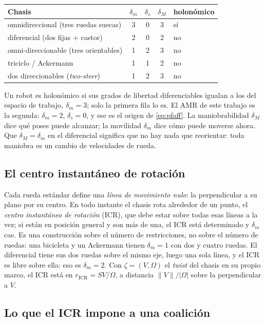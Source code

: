 \begin{center}\small
\begin{tabular}{@{}lccc l@{}}
\toprule
Chasis & $\delta_m$ & $\delta_s$ & $\delta_M$ & holonómico \\
\midrule
omnidireccional (tres ruedas suecas) & 3 & 0 & 3 & sí \\
diferencial (dos fijas + castor) & 2 & 0 & 2 & no \\
omni-direccionable (tres orientables) & 1 & 2 & 3 & no \\
triciclo / Ackermann & 1 & 1 & 2 & no \\
dos direccionables (\emph{two-steer}) & 1 & 2 & 3 & no \\
\bottomrule
\end{tabular}
\end{center}

Un robot es holonómico si sus grados de libertad diferenciables igualan a los del
espacio de trabajo, $\delta_m=3$; solo la primera fila lo es. El AMR de este
trabajo es la segunda: $\delta_m=2$, $\delta_s=0$, y ese es el origen de
\eqref{eq:pfaff}. La maniobrabilidad $\delta_M$ dice qué poses puede alcanzar;
la movilidad $\delta_m$ dice cómo puede moverse ahora. Que $\delta_M=\delta_m$
en el diferencial significa que no hay nada que reorientar: toda maniobra es un
cambio de velocidades de rueda.

\subsection{El centro instantáneo de rotación}

Cada rueda estándar define una \emph{línea de movimiento nulo}: la perpendicular
a su plano por su centro. En todo instante el chasis rota alrededor de un punto,
el \emph{centro instantáneo de rotación} (ICR), que debe estar sobre todas esas
líneas a la vez; si están en posición general y son más de una, el ICR está
determinado y $\delta_m$ cae. Es una construcción sobre el número de
restricciones, no sobre el número de ruedas: una bicicleta y un Ackermann tienen
$\delta_m=1$ con dos y cuatro ruedas. El diferencial tiene sus dos ruedas sobre
el mismo eje, luego una sola línea, y el ICR es libre sobre ella: eso es
$\delta_m=2$. Con $\zeta=(V,\Omega)$ el \emph{twist} del chasis en su propio
marco, el ICR está en $r_{\mathrm{ICR}}=SV/\Omega$, a distancia
$\lVert V\rVert/|\Omega|$ sobre la perpendicular a $V$.

\subsection{Lo que el ICR impone a una coalición}

